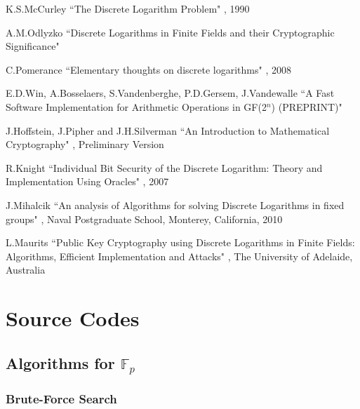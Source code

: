 \documentclass[iwp,first]{luthesis}
\begin{document}
\begin{thebibliography}{33}
 K.S.McCurley
\newblock``The Discrete Logarithm Problem"
, 1990

 A.M.Odlyzko
\newblock ``Discrete Logarithms in Finite Fields and their Cryptographic Significance"

 C.Pomerance
\newblock``Elementary thoughts on discrete logarithms"
, 2008

 E.D.Win, A.Bosselaers, S.Vandenberghe, P.D.Gersem, J.Vandewalle
\newblock ``A Fast Software Implementation for Arithmetic Operations in GF(2$^n$) (PREPRINT)"

 J.Hoffstein, J.Pipher and J.H.Silverman
\newblock ``An Introduction to Mathematical Cryptography"
, Preliminary Version

 R.Knight
\newblock ``Individual Bit Security of the Discrete Logarithm: Theory and Implementation Using Oracles"
, 2007

 J.Mihalcik
\newblock ``An analysis of Algorithms for solving Discrete Logarithms in fixed groups"
, Naval Postgraduate School, Monterey, California, 2010

 L.Maurits
\newblock ``Public Key Cryptography using Discrete Logarithms in Finite Fields: Algorithms, Efficient Implementation and Attacks"
, The University of Adelaide, Australia



\end{thebibliography}

\backmatter
\appendix


\chapter{Source Codes}

\section{Algorithms for $\mathbb{F}_p$}

\subsection{Brute-Force Search}
\end{document}
